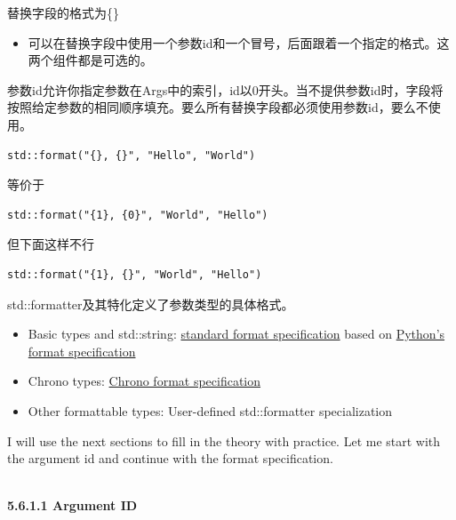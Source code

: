 替换字段的格式为\{\}

\begin{itemize}
\item 
可以在替换字段中使用一个参数id和一个冒号，后面跟着一个指定的格式。这两个组件都是可选的。
\end{itemize}

参数id允许你指定参数在Args中的索引，id以0开头。当不提供参数id时，字段将按照给定参数的相同顺序填充。要么所有替换字段都必须使用参数id，要么不使用。

\begin{lstlisting}[style=styleCXX]
std::format("{}, {}", "Hello", "World") 
\end{lstlisting}

等价于

\begin{lstlisting}[style=styleCXX]
std::format("{1}, {0}", "World", "Hello")
\end{lstlisting}

但下面这样不行

\begin{lstlisting}[style=styleCXX]
std::format("{1}, {}", "World", "Hello") 
\end{lstlisting}

std::formatter及其特化定义了参数类型的具体格式。

\begin{itemize}
\item 
Basic types and std::string: \href{https://en.cppreference.com/w/cpp/utility/format/formatter#Standard_format_specification}{standard format specification} based on \href{ttps://docs.python.org/3/library/stdtypes.html#str.format}{Python’s format specification}

\item 
Chrono types: \href{ttps://en.cppreference.com/w/cpp/chrono/system_clock/formatter#Format_specification}{Chrono format specification}

\item 
Other formattable types: User-defined std::formatter specialization
\end{itemize}

I will use the next sections to fill in the theory with practice. Let me start with the argument id and continue with the format specification.

\hspace*{\fill} \\ %
\noindent
\textbf{5.6.1.1\hspace{0.2cm} Argument ID}

